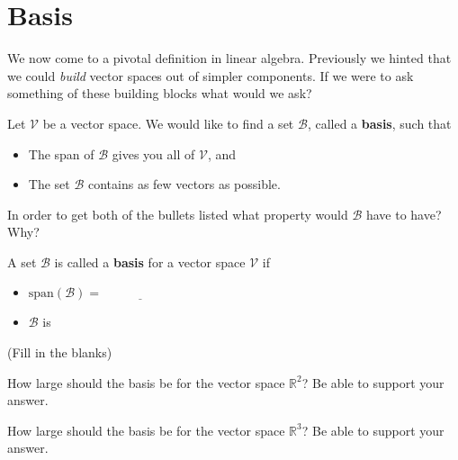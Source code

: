 \newpage\section{Basis}
We now come to a pivotal definition in linear algebra.  Previously we hinted that we
could {\it build} vector spaces out of simpler components.  If we were to ask something of
these building blocks what would we ask?
\begin{problem}
    Let $\mathcal{V}$ be a vector space.  We would like to find a set $\mathcal{B}$,
    called a {\bf basis}, such that
    \begin{itemize}
        \item The span of $\mathcal{B}$ gives you all of $\mathcal{V}$, and 
        \item The set $\mathcal{B}$ contains as few vectors as possible.
    \end{itemize}
    In order to get both of the bullets listed what property would $\mathcal{B}$ have to
    have?  Why?
\end{problem}

\begin{definition}
    A set $\mathcal{B}$ is called a {\bf basis} for a vector space $\mathcal{V}$ if 
    \begin{itemize}
        \item $\text{span}(\mathcal{B}) = \underline{\hspace{1in}}$
        \item $\mathcal{B}$ is \underline{\hspace{1in}}
    \end{itemize}
    (Fill in the blanks)
\end{definition}

\begin{problem}
    How large should the basis be for the vector space $\mathbb{R}^2$?  Be able to support
    your answer.
\end{problem}

\begin{problem}
    How large should the basis be for the vector space $\mathbb{R}^3$?  Be able to support
    your answer.
\end{problem}



